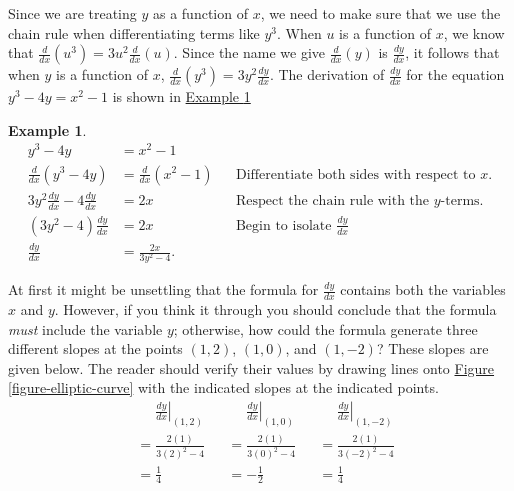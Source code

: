 \documentclass[10pt,oneside,]{book}
\theoremstyle{plain}
\theoremstyle{definition}
\newtheorem{example}[theorem]{Example}
\numberwithin{equation}{section}
\newcommand{\point}[2]{\left(#1,#2\right)}
\newcommand{\lz}[2]{\frac{d#1}{d#2}}
\newcommand{\lzoo}[2]{{\frac{d}{d#1}}{\left(#2\right)}}
\newcommand{\lzoa}[3]{\left.{\frac{d#1}{d#2}}\right|_{#3}}
\begin{document}
\par
Since we are treating \(y\) as a function of \(x\), we need to make sure that we use the chain rule when differentiating terms like \(y^3\).  When \(u\) is a function of \(x\), we know that \(\lzoo{x}{u^3}=3u^2\lzoo{x}{u}\). Since the name we give \(\lzoo{x}{y}\) is \(\lz{y}{x}\), it follows that when \(y\) is a function of \(x\), \(\lzoo{x}{y^3}=3y^2\lz{y}{x}\). The derivation of \(\lz{y}{x}\) for the equation \(y^3-4y=x^2-1\) is shown in \hyperref[example-implicit-differentiation]{Example \ref{example-implicit-differentiation}}%
\begin{example}\label{example-implicit-differentiation}
\begin{align*}
y^3-4y&=x^2-1\\
\lzoo{x}{y^3-4y}&=\lzoo{x}{x^2-1}&&\text{Differentiate both sides with respect to $x$.}\\
3y^2\lz{y}{x}-4\lz{y}{x}&=2x&&\text{Respect the chain rule with the $y$-terms.}\\
\left(3y^2-4\right)\lz{y}{x}&=2x&&\text{Begin to isolate $\lz{y}{x}$}\\
\lz{y}{x}&=\frac{2x}{3y^2-4}.
\end{align*}%
\end{example}
\par
At first it might be unsettling that the formula for \(\lz{y}{x}\) contains both the variables \(x\) and \(y\). However, if you think it through you should conclude that the formula \emph{must} include the variable \(y\); otherwise, how could the formula generate three different slopes at the points \(\point{1}{2}\), \(\point{1}{0}\), and \(\point{1}{-2}\)?  These slopes are given below.  The reader should verify their values by drawing lines onto \hyperref[figure-elliptic-curve]{Figure \ref{figure-elliptic-curve}} with the indicated slopes at the indicated points.\begin{align*}
&\phantom{{}={}}\lzoa{y}{x}{\point{1}{2}}&&\phantom{{}={}}\lzoa{y}{x}{\point{1}{0}}&&\phantom{{}={}}\lzoa{y}{x}{\point{1}{-2}}\\
&=\frac{2(1)}{3(2)^2-4}&&=\frac{2(1)}{3(0)^2-4}&&=\frac{2(1)}{3(-2)^2-4}\\
&=\frac{1}{4}&&=-\frac{1}{2}&&=\frac{1}{4}
\end{align*}%
\typeout{************************************************}
\typeout{************************************************}
\end{document}
